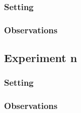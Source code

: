 \documentclass[11pt]{article}
\begin{document}
\subsubsection{Setting}

\subsubsection{Observations}

\subsection{Experiment n}

\subsubsection{Setting}

\subsubsection{Observations}
\end{document}
